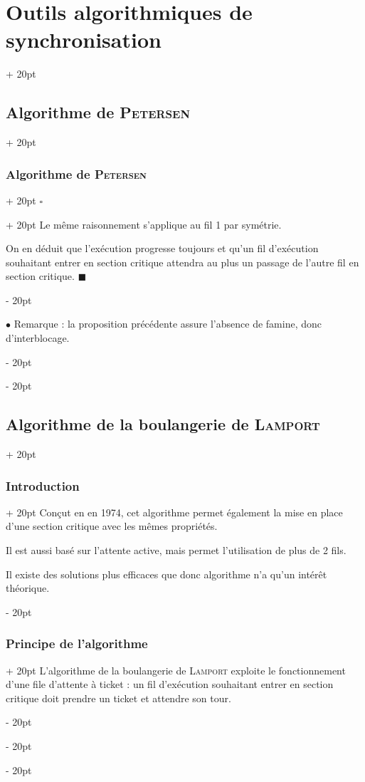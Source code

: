\documentclass[a4paper, 12pt, twoside]{article}
\newcommand{\ind}[1][20pt]{\advance\leftskip + #1}
\newcommand{\deind}[1][20pt]{\advance\leftskip - #1}
\newenvironment{indt}[2][20pt]{#2 \par \ind[#1]}{\par \deind} %
\newenvironment{proof}[1][{}]{\begin{indt}{$\square$ #1}}{$\blacksquare$ \end{indt}}
\begin{document}
\begin{indt}{\section{Outils algorithmiques de synchronisation}}
\begin{indt}{\subsection{Algorithme de \textsc{Petersen}}}
\begin{indt}{\subsubsection{Algorithme de \textsc{Petersen}}}
\begin{proof}
                    Le même raisonnement s'applique au fil 1 par symétrie.

                    On en déduit que l'exécution progresse toujours et qu'un fil d'exécution souhaitant entrer en section critique attendra au plus un passage de l'autre fil en section critique.
                \end{proof}

                \vspace{12pt}
                
                $\bullet$ Remarque : la proposition précédente assure l'absence de famine, donc d'interblocage.
            \end{indt}
        \end{indt}

        \vspace{12pt}
        
        \begin{indt}{\subsection{Algorithme de la boulangerie de \textsc{Lamport}}}
            \begin{indt}{\subsubsection{Introduction}}
                Conçut en en 1974, cet algorithme permet également la mise en place d'une section critique avec les mêmes propriétés.

                Il est aussi basé sur l'attente active, mais permet l'utilisation de plus de 2 fils.

                Il existe des solutions plus efficaces que donc algorithme n'a qu'un intérêt théorique.
            \end{indt}

            \vspace{12pt}
            
            \begin{indt}{\subsubsection{Principe de l'algorithme}}
                L'algorithme de la boulangerie de \textsc{Lamport} exploite le fonctionnement d'une file d'attente à ticket : un fil d'exécution souhaitant entrer en section critique doit prendre un ticket et attendre son tour.


\end{indt}
\end{indt}
\end{indt}
\end{document}
